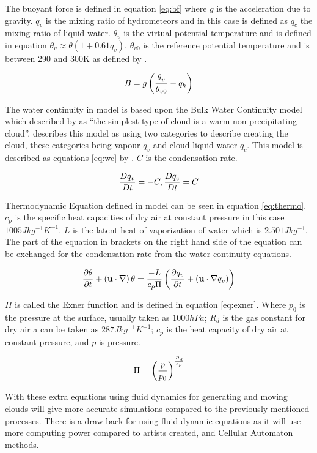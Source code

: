 The buoyant force is defined in equation \ref{eq:bf} where $g$ is the acceleration due to gravity.
$q_{v}$ is the mixing ratio of hydrometeors and in this case is defined as $q_{c}$ the mixing ratio of liquid water.
$\theta_{v}$ is the virtual potential temperature and is defined in equation $\theta_{v} \approx \theta(1+0.61 q_{v})$.
$\theta_{v0}$ is the reference potential temperature and is between 290 and 300K as defined by \citet{HarrisEtAl03}.

\begin{equation} \label{eq:bf}
  \centering
  B = g\left(\frac{\theta_{v}}{\theta_{v0}} - q_{h}\right)
\end{equation}

The water continuity in \citet{HarrisEtAl03} model is based upon the Bulk Water Continuity model which described by \citet{houze1994cloud} as “the simplest type of cloud is a warm non-precipitating cloud”.
\citet{houze1994cloud} describes this model as using two categories to describe creating the cloud, these categories being vapour $q_{v}$ and cloud liquid water $q_{c}$.
This model is described as equations \ref{eq:wc} by \citet{houze1994cloud}.
$C$ is the condensation rate.

\begin{equation} \label{eq:wc}
  \centering
  \frac{Dq_{v}}{Dt} = - C,	\frac{Dq_{c}}{Dt} = C
\end{equation}

Thermodynamic Equation defined in \citet{HarrisEtAl03} model can be seen in equation \ref{eq:thermo}. $c_{p}$ is the specific heat capacities of dry air at constant pressure in this case $1005J kg^{-1} K^{-1}$. $L$ is the latent heat of vaporization of water which is $2.501 J kg^{-1}$.
The part of the equation in brackets on the right hand side of the equation can be exchanged for the condensation rate from the water continuity equations.

\begin{equation} \label{eq:thermo}
  \centering
  \frac{\partial\theta}{\partial t} + \left(\mathbf{u}\cdot\nabla\right)\theta = \frac{-L}{c_{p}\Pi}\left(\frac{\partial q_{v}}{\partial t} + \left(\mathbf{u\cdot\nabla}q_{v}\right)\right)
\end{equation}

$\Pi$ is called the Exner function and is defined in equation \ref{eq:exner}.
Where $p_{0}$ is the pressure at the surface, usually taken as $1000 hPa$; $R_{d}$ is the gas constant for dry air a can be taken as $287 J kg^{-1} K^{-1}$; $c_{p}$ is the heat capacity of dry air at constant pressure, and $p$ is pressure.

\begin{equation} \label{eq:exner}
  \centering
  \Pi = \left(\frac{p}{p_{0}}\right)^{\frac{R_{d}}{c_{p}}}
\end{equation}

With these extra equations using fluid dynamics for generating and moving clouds will give more accurate simulations compared to the previously mentioned processes. There is a draw back for using fluid dynamic equations as it will use more computing power compared to artists created, and Cellular Automaton methods. 